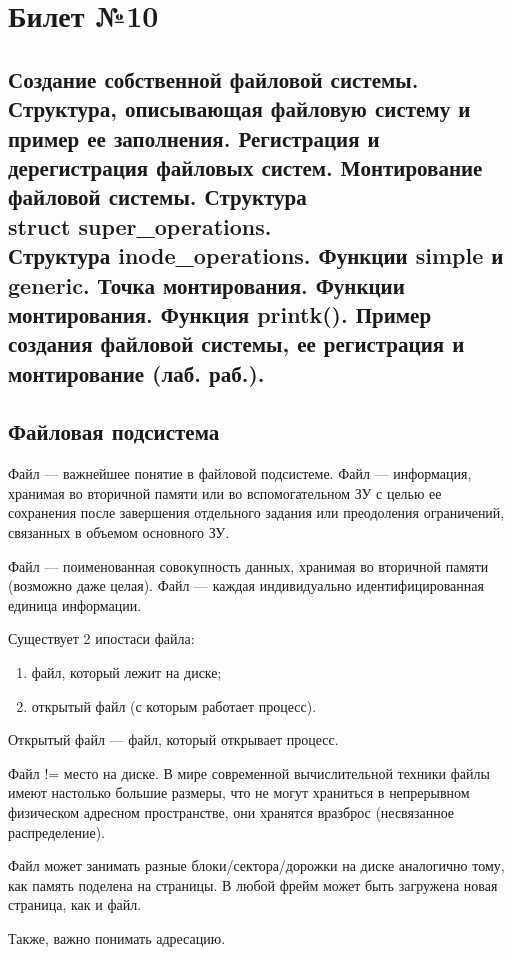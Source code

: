 \chapter{Билет №10}

\section*{Создание собственной файловой системы. Структура, описывающая файловую систему и пример ее заполнения. Регистрация и дерегистрация файловых систем. Монтирование файловой системы. Структура \\struct super\_operations. \\ Структура inode\_operations. Функции simple и generic. Точка монтирования. Функции монтирования. Функция printk(). Пример создания файловой системы, ее регистрация и монтирование (лаб. раб.).}


\section{Файловая подсистема}
Файл --- важнейшее понятие в файловой подсистеме. Файл --- информация, хранимая во вторичной памяти или во вспомогательном ЗУ с целью ее сохранения после завершения отдельного задания или преодоления ограничений, связанных в объемом основного ЗУ.

Файл --- поименованная совокупность данных, хранимая во вторичной памяти (возможно даже целая). Файл --- каждая индивидуально идентифицированная единица информации.

Существует 2 ипостаси файла:
\begin{enumerate}
	\item файл, который лежит на диске;
	\item открытый файл (с которым работает процесс).
\end{enumerate}

Открытый файл --- файл, который открывает процесс.

Файл != место на диске. В мире современной вычислительной техники файлы имеют настолько большие размеры, что не могут храниться в непрерывном физическом адресном пространстве, они хранятся вразброс (несвязанное распределение).

Файл может занимать разные блоки/сектора/дорожки на диске аналогично тому, как память поделена на страницы. В любой фрейм может быть загружена новая страница, как и файл. 

Также, важно понимать адресацию. 

